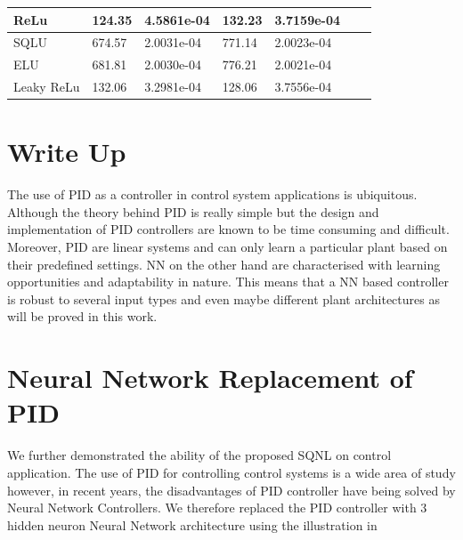 \documentclass{article}
\begin{document}
\begin{table}
\begin{tabular}{|l|l|l|l|l|l|l|}
ReLu                                                         & 124.35 & 4.5861e-04                                           & 132.23 & 3.7159e-04                                           &       &                                                      \\ \hline
SQLU                                                         & 674.57 & 2.0031e-04                                           & 771.14 & 2.0023e-04                                           &       &                                                      \\ \hline
ELU                                                          & 681.81 & 2.0030e-04                                           & 776.21 & 2.0021e-04                                           &       &                                                      \\ \hline
Leaky ReLu                                                   & 132.06 & 3.2981e-04                                           & 128.06 & 3.7556e-04                                           &       &                                                      \\ \hline
\end{tabular}
\end{table}


\section{Write Up}
The use of PID as a controller in control system applications is ubiquitous. Although the theory behind PID is really simple but the design and implementation of PID controllers are known to be time consuming and difficult. Moreover, PID are linear systems and can only learn a particular plant based on their predefined settings. NN on the other hand are characterised with learning opportunities and adaptability in nature. This means that a NN based controller is robust to several input types and even maybe different plant architectures as will be proved in this work.

\section{Neural Network Replacement of PID}
We further demonstrated the ability of the proposed SQNL on control application. The use of PID for controlling control systems is a wide area of study however, in recent years, the disadvantages of PID controller have being solved by Neural Network Controllers. We therefore replaced the PID controller with 3 hidden neuron Neural Network architecture using the illustration in 
\end{document}
